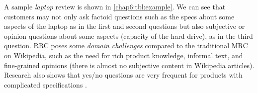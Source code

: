 \label{sec:intro}
\begin{table}
    \centering
    \caption{Review reading comprehension}
    \label{chap6:tbl:example}
\end{table}

A sample \emph{laptop} review is shown in \ref{chap6:tbl:example}. 
We can see that customers may not only ask factoid questions such as the specs about some aspects of the laptop as in the first and second questions but also subjective or opinion questions about some aspects (capacity of the hard drive), as in the third question.
RRC poses some \textit{domain challenges} compared to the traditional MRC on Wikipedia, such as the need for rich product knowledge, informal text, and fine-grained opinions (there is almost no subjective content in Wikipedia articles). Research also shows that yes/no questions are very frequent for products with complicated specifications \cite{mcauley2016addressing,Xu2018pro}.

